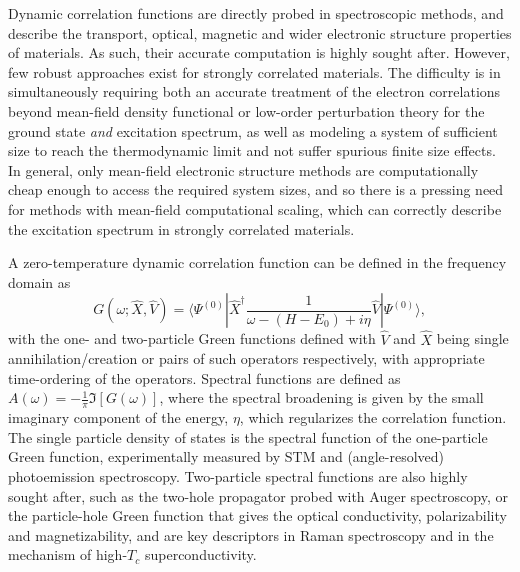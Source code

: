 \documentclass[aps,twocolumn,nobibnotes]{revtex4}
\begin{document}
Dynamic correlation functions are directly probed in spectroscopic methods,
and describe the transport, optical, magnetic and wider electronic structure properties of materials. 
As such, their accurate computation is highly sought after. 
However, few robust approaches exist for strongly correlated materials\cite{Gali2013}. The difficulty is in simultaneously requiring both an accurate 
treatment of the electron correlations beyond mean-field density functional or low-order perturbation theory for the ground state {\em and} excitation spectrum, as well as modeling 
a system of sufficient size to reach the thermodynamic limit and not suffer spurious finite size effects. 
In general, only mean-field electronic structure methods are computationally cheap enough to access the required system
sizes, and so there is a pressing need for methods with mean-field computational scaling, which can correctly describe 
the excitation spectrum in strongly correlated materials.

A zero-temperature dynamic correlation function can be defined in the frequency domain as
\begin{equation}
    G(\omega;{\hat X},{\hat V}) = \langle \Psi^{(0)} | {\hat X}^{\dagger} \frac{1}{\omega-(H-E_0)+i \eta} {\hat V} | \Psi^{(0)} \rangle , \label{eqn:intCorrFunc}
\end{equation}
with the one- and two-particle Green functions defined with ${\hat V}$ and ${\hat X}$ being single annihilation/creation or pairs of such operators 
respectively, with appropriate time-ordering of the operators. Spectral functions are defined as $A(\omega)=-\frac{1}{\pi}\Im[G(\omega)]$,
where the spectral broadening is given by the small imaginary component of the energy, $\eta$, which regularizes the correlation function. The single particle
density of states is the spectral function of the one-particle Green function, experimentally measured by STM 
and (angle-resolved) photoemission spectroscopy. Two-particle spectral functions are also highly sought after, such as the two-hole propagator 
probed with Auger spectroscopy\cite{Mona2013}, or the particle-hole Green function that gives the optical conductivity, polarizability and
magnetizability, and are key descriptors in 
Raman spectroscopy and in the mechanism of high-$T_c$ superconductivity\cite{Millis2012,Sordi2012,Millis2013}.
\end{document}
